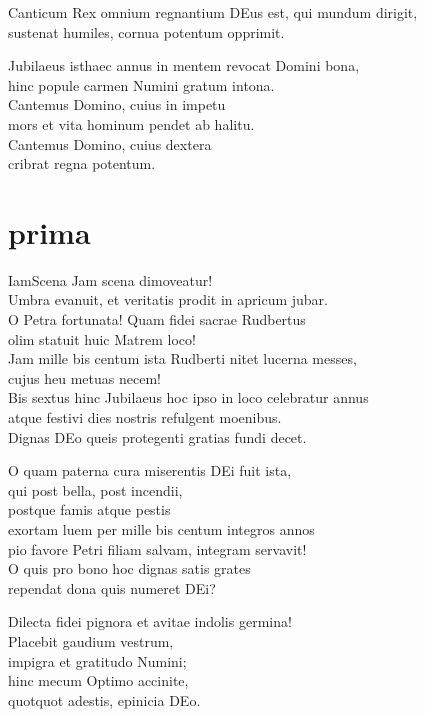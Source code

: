 \documentclass[tocstyle=ref-genre]{ees}
\begin{document}
{\begin{movement}{Canticum}
  Rex omnium regnantium DEus est, qui mundum dirigit,\\
  sustenat humiles, cornua potentum opprimit.

  \voice[Coro]
  Jubilaeus isthaec annus in mentem revocat Domini bona,\\
  hinc popule carmen Numini gratum intona.\\
  Cantemus Domino, cuius in impetu\\
  mors et vita hominum pendet ab halitu.\\
  Cantemus Domino, cuius dextera\\
  cribrat regna potentum.
\end{movement}

\part{prima}

\begin{movement}{IamScena}
  Jam scena dimoveatur!\\
  Umbra evanuit, et veritatis prodit in apricum jubar.\\
  O Petra fortunata! Quam fidei sacrae Rudbertus\\
  olim statuit huic Matrem loco!\\
  Jam mille bis centum ista Rudberti nitet lucerna messes,\\
  cujus heu metuas necem!\\
  Bis sextus hinc Jubilaeus hoc ipso in loco celebratur annus\\
  atque festivi dies nostris refulgent moenibus.\\
  Dignas DEo queis protegenti gratias fundi decet.

  O quam paterna cura miserentis DEi fuit ista,\\
  qui post bella, post incendii,\\
  postque famis atque pestis\\
  exortam luem per mille bis centum integros annos\\
  pio favore Petri filiam salvam, integram servavit!\\
  O quis pro bono hoc dignas satis grates\\
  rependat dona quis numeret DEi?

  Dilecta fidei pignora et avitae indolis germina!\\
  Placebit gaudium vestrum,\\
  impigra et gratitudo Numini;\\
  hinc mecum Optimo accinite,\\
  quotquot adestis, epinicia DEo.
\end{movement}

}
\end{document}

